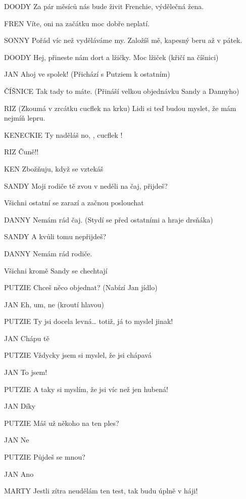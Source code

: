 DOODY        Za pár měsíců nás bude živit Frenchie, výdělečná žena. 

FREN        Víte, oni na začátku moc dobře neplatí. 

SONNY        Pořád víc než vyděláváme my. Založíš mě, kapesný beru až v pátek. 

DOODY         Hej, přineste nám dort a  lžičky.  Moc lžiček (křičí na číšnici) 

JAN         Ahoj ve spolek! (Přichází s Putziem k ostatním) 

ČÍŠNICE        Tak tady to máte. (Přináší velkou objednávku Sandy a Dannyho) 

RIZ         (Zkoumá v zrcátku cucflek na krku) Lidi si teď budou myslet, že mám         nejmíň lepru. 

KENECKIE        Ty naděláš no, , cucflek ! 

RIZ                Čuně!! 

KEN        Zbožňuju, když se vztekáš 

SANDY        Moji rodiče tě zvou v neděli na čaj, přijdeš? 

Všichni ostatní se zarazí a začnou poslouchat 

DANNY        Nemám rád čaj. (Stydí se před ostatními a hraje drsňáka) 

SANDY         A kvůli tomu nepřijdeš? 

DANNY        Nemám rád rodiče. 

Všichni kromě Sandy se chechtají 

PUTZIE        Chceš něco objednat? (Nabízí Jan jídlo) 

JAN        Eh, um, ne (kroutí hlavou) 

PUTZIE         Ty jsi docela levná… totiž, já to myslel jinak! 

JAN        Chápu tě 

PUTZIE        Vždycky jsem si myslel, že jsi chápavá 

JAN        To jsem! 

PUTZIE        A taky si myslím, že jsi víc než jen hubená!

JAN        Díky 

PUTZIE         Máš už někoho na ten ples? 

JAN        Ne

PUTZIE        Půjdeš se mnou? 

JAN        Ano 

MARTY        Jestli zítra neudělám ten test, tak budu úplně v háji!

